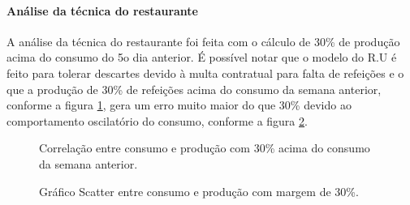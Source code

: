 \documentclass[	12pt, Times, openright, twoside, a4paper, english, brazil]{abntex2}
\begin{document}
    	    \paragraph{Análise da técnica do restaurante}
    	        A análise da técnica do restaurante foi feita com o cálculo de 30\% de produção acima do consumo do 5o dia anterior.
    	        É possível notar que o modelo do R.U é feito para tolerar descartes devido à multa contratual para falta de refeições e o que a produção de 30\% de refeições acima do consumo da semana anterior, conforme a figura  \ref{fig:case1_ru_pred.png}, gera um erro muito maior do que 30\% devido ao comportamento oscilatório do consumo, conforme a figura \ref{fig:case1_ru_pred_scatter}. 
    	         \begin{figure}[!ht]
                	\caption{Correlação entre consumo e produção com 30\% acima do consumo da semana anterior. \label{fig:case1_ru_pred.png} }
                \end{figure}
                \begin{figure}[!ht]
                	\caption{Gráfico Scatter entre consumo e produção com margem de 30\%. \label{fig:case1_ru_pred_scatter} }
                \end{figure}
\end{document}
